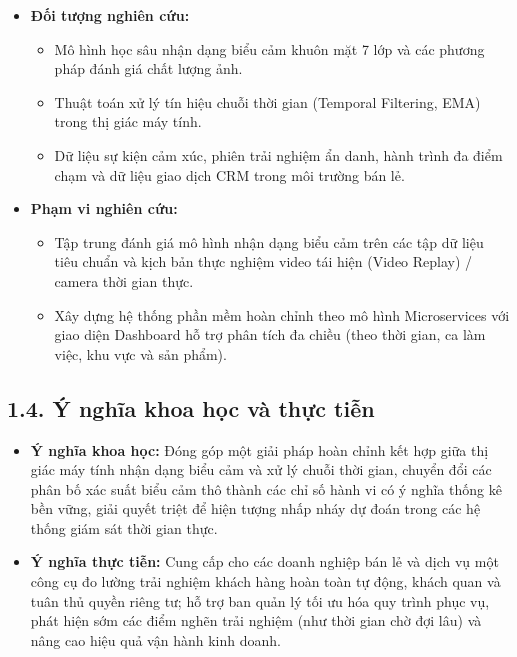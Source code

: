 \begin{itemize}
    \item \textbf{Đối tượng nghiên cứu:}
    \begin{itemize}
        \item Mô hình học sâu nhận dạng biểu cảm khuôn mặt 7 lớp và các phương pháp đánh giá chất lượng ảnh.
        \item Thuật toán xử lý tín hiệu chuỗi thời gian (Temporal Filtering, EMA) trong thị giác máy tính.
        \item Dữ liệu sự kiện cảm xúc, phiên trải nghiệm ẩn danh, hành trình đa điểm chạm và dữ liệu giao dịch CRM trong môi trường bán lẻ.
    \end{itemize}
    \item \textbf{Phạm vi nghiên cứu:}
    \begin{itemize}
        \item Tập trung đánh giá mô hình nhận dạng biểu cảm trên các tập dữ liệu tiêu chuẩn và kịch bản thực nghiệm video tái hiện (Video Replay) / camera thời gian thực.
        \item Xây dựng hệ thống phần mềm hoàn chỉnh theo mô hình Microservices với giao diện Dashboard hỗ trợ phân tích đa chiều (theo thời gian, ca làm việc, khu vực và sản phẩm).
    \end{itemize}
\end{itemize}

\subsection*{1.4. Ý nghĩa khoa học và thực tiễn}

\begin{itemize}
    \item \textbf{Ý nghĩa khoa học:}
    Đóng góp một giải pháp hoàn chỉnh kết hợp giữa thị giác máy tính nhận dạng biểu cảm và xử lý chuỗi thời gian, chuyển đổi các phân bố xác suất biểu cảm thô thành các chỉ số hành vi có ý nghĩa thống kê bền vững, giải quyết triệt để hiện tượng nhấp nháy dự đoán trong các hệ thống giám sát thời gian thực.
    \item \textbf{Ý nghĩa thực tiễn:}
    Cung cấp cho các doanh nghiệp bán lẻ và dịch vụ một công cụ đo lường trải nghiệm khách hàng hoàn toàn tự động, khách quan và tuân thủ quyền riêng tư; hỗ trợ ban quản lý tối ưu hóa quy trình phục vụ, phát hiện sớm các điểm nghẽn trải nghiệm (như thời gian chờ đợi lâu) và nâng cao hiệu quả vận hành kinh doanh.
\end{itemize}

